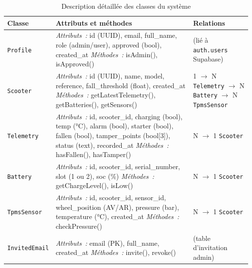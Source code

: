 \documentclass[12pt, a4paper]{report}
\begin{document}
\begin{table}[H]
  \centering
  \caption{Description détaillée des classes du système}
  \label{tab:classes_detail}
  \renewcommand{\arraystretch}{1.4}
  \small
  \begin{tabularx}{\textwidth}{|p{2.5cm}|X|p{3.5cm}|}
    \hline
    \rowcolor{isimablue!20}
    \textbf{Classe} & \textbf{Attributs et méthodes} & \textbf{Relations} \\
    \hline
    \texttt{Profile} &
      \textit{Attributs~:} id (UUID), email, full\_name, role (admin/user),
      approved (bool), created\_at\newline
      \textit{Méthodes~:} isAdmin(), isApproved() &
      (lié à \texttt{auth.users} Supabase) \\
    \hline
    \texttt{Scooter} &
      \textit{Attributs~:} id (UUID), name, model, reference,
      fall\_threshold (float), created\_at\newline
      \textit{Méthodes~:} getLatestTelemetry(), getBatteries(), getSensors() &
      1 $\rightarrow$ N \texttt{Telemetry}\newline
      1 $\rightarrow$ N \texttt{Battery}\newline
      1 $\rightarrow$ N \texttt{TpmsSensor} \\
    \hline
    \texttt{Telemetry} &
      \textit{Attributs~:} id, scooter\_id, charging (bool), temp (°C),
      alarm (bool), starter (bool), fallen (bool),
      tamper\_points (bool[3]), status (text), recorded\_at\newline
      \textit{Méthodes~:} hasFallen(), hasTamper() &
      N $\rightarrow$ 1 \texttt{Scooter} \\
    \hline
    \texttt{Battery} &
      \textit{Attributs~:} id, scooter\_id, serial\_number, slot (1 ou 2),
      soc (\%)\newline
      \textit{Méthodes~:} getChargeLevel(), isLow() &
      N $\rightarrow$ 1 \texttt{Scooter} \\
    \hline
    \texttt{TpmsSensor} &
      \textit{Attributs~:} id, scooter\_id, sensor\_id, wheel\_position
      (AV/AR), pressure (bar), temperature (°C), created\_at\newline
      \textit{Méthodes~:} checkPressure() &
      N $\rightarrow$ 1 \texttt{Scooter} \\
    \hline
    \texttt{InvitedEmail} &
      \textit{Attributs~:} email (PK), full\_name, created\_at\newline
      \textit{Méthodes~:} invite(), revoke() &
      (table d'invitation admin) \\
    \hline
  \end{tabularx}
\end{table}
\end{document}
